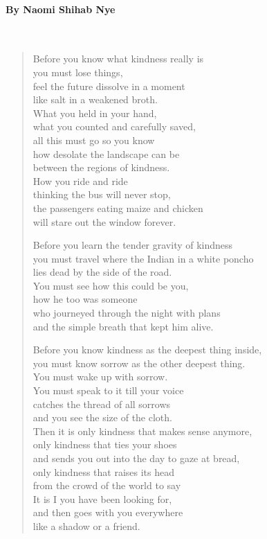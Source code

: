 \paragraph{By Naomi Shihab Nye}~
\begin{verse}
	Before you know what kindness really is\\
	you must lose things,\\
	feel the future dissolve in a moment\\
	like salt in a weakened broth.\\
	What you held in your hand,\\
	what you counted and carefully saved,\\
	all this must go so you know\\
	how desolate the landscape can be\\
	between the regions of kindness.\\
	How you ride and ride\\
	thinking the bus will never stop,\\
	the passengers eating maize and chicken\\
	will stare out the window forever.

	Before you learn the tender gravity of kindness\\
	you must travel where the Indian in a white poncho\\
	lies dead by the side of the road.\\
	You must see how this could be you,\\
	how he too was someone\\
	who journeyed through the night with plans\\
	and the simple breath that kept him alive.

	Before you know kindness as the deepest thing inside,\\
	you must know sorrow as the other deepest thing.\\
	You must wake up with sorrow.\\
	You must speak to it till your voice\\
	catches the thread of all sorrows\\
	and you see the size of the cloth.\\
	Then it is only kindness that makes sense anymore,\\
	only kindness that ties your shoes\\
	and sends you out into the day to gaze at bread,\\
	only kindness that raises its head\\
	from the crowd of the world to say\\
	It is I you have been looking for,\\
	and then goes with you everywhere\\
	like a shadow or a friend.
\end{verse}

